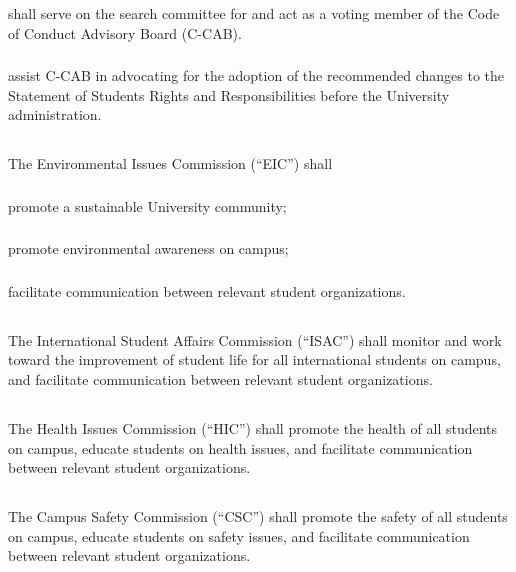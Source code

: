 \subsubsection{}
shall serve on the search committee for and act as a voting member of the Code of Conduct Advisory Board (C-CAB).
\subsubsection{}
assist C-CAB in advocating for the adoption of the recommended changes to the Statement of Students Rights and Responsibilities before the University administration.


\subsection{}
The Environmental Issues Commission (``EIC'') shall
\subsubsection{}
promote a sustainable University community;
\subsubsection{}
promote environmental awareness on campus;
\subsubsection{}
facilitate communication between relevant student organizations.


\subsection{}
The International Student Affairs Commission (``ISAC'') shall monitor and work toward the improvement of student life for all international students on campus, and facilitate communication between relevant student organizations.

\subsection{}
The Health Issues Commission (``HIC'') shall promote the health of all students on campus, educate students on health issues, and facilitate communication between relevant student organizations.

\subsection{}
The Campus Safety Commission (``CSC'') shall promote the safety of all students on campus, educate students on safety issues, and facilitate communication between relevant student organizations.

